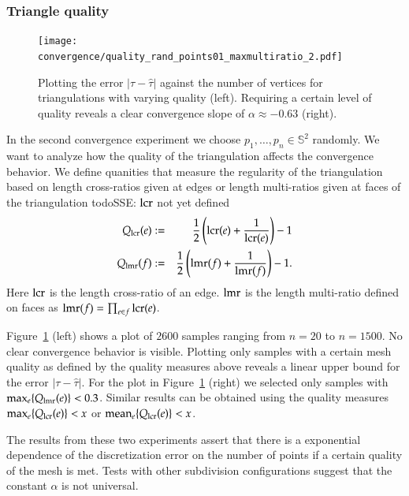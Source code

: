 \documentclass[Thesis.tex]{subfiles}
\begin{document}
\subsubsection{Triangle quality}

\begin{figure}
\centering
\texttt{[image: convergence/quality\_rand\_points01\_maxmultiratio\_2.pdf]}
\caption{Plotting the error $|\tau - \hat\tau|$ against the number of vertices for triangulations with varying quality (left). Requiring a certain level of quality reveals a clear convergence slope of $\alpha\approx -0.63$ (right).}
\label{fig:convergence_quality}
\end{figure}

In the second convergence experiment we choose $p_1,\ldots,p_n\in \mathbb S^2$ randomly. We want to analyze how the quality of the triangulation affects the convergence behavior. We define quanities that measure the regularity of the triangulation based on length cross-ratios given at edges or length multi-ratios given at faces of the triangulation
todo{SSE: $\operatorname{lcr}$ not yet defined}
\begin{eqnarray*}
	Q_{\operatorname{lcr}}(e) &:=& \frac{1}{2}\left(\operatorname{lcr}(e) + \frac{1}{\operatorname{lcr}(e)}\right) - 1\label{eq:quality_lcr}\\
	Q_{\operatorname{lmr}}(f) &:=& \frac{1}{2}\left(\operatorname{lmr}(f) + \frac{1}{\operatorname{lmr}(f)}\right) - 1\label{eq:quality_lmr}.
\end{eqnarray*}
Here $\operatorname{lcr}$ is the length cross-ratio of an edge. $\operatorname{lmr}$ is the length multi-ratio defined on faces as $\operatorname{lmr}(f)=\prod_{e \in f}\operatorname{lcr}(e)$.

Figure~\ref{fig:convergence_quality} (left) shows a plot of $2600$ samples ranging from $n=20$ to $n=1500$. No clear convergence behavior is visible. Plotting only samples with a certain mesh quality as defined by the quality measures above reveals a linear upper bound for the error $|\tau-\hat \tau|$. For the plot in Figure~\ref{fig:convergence_quality} (right) we selected only samples with $\max_e \{Q_{\operatorname{lmr}}(e)\} < 0.3$. Similar results can be obtained using the quality measures $\max_e \{Q_{\operatorname{lcr}}(e)\} < x$ or $\operatorname{mean}_e \{Q_{\operatorname{lcr}}(e)\} < x$.

The results from these two experiments assert that there is a exponential dependence of the discretization error on the number of points if a certain quality of the mesh is met. Tests with other subdivision configurations suggest that the constant $\alpha$ is not universal.
\end{document}
